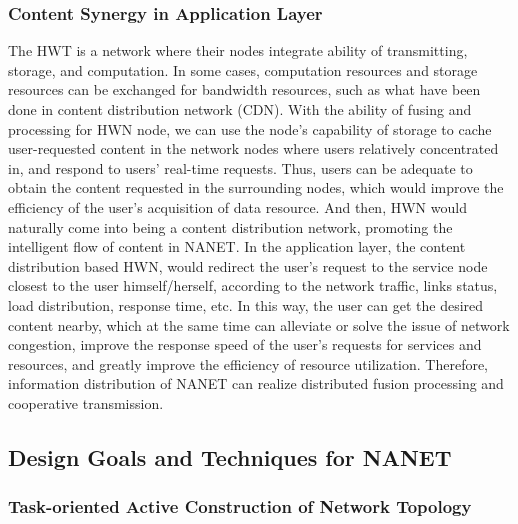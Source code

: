 \documentclass[journal,comsoc]{IEEEtran}
\begin{document}
			\subsubsection{Content Synergy in Application Layer}
				The HWT is a network where their nodes integrate ability of transmitting, storage, and computation.
				In some cases, computation resources and storage resources can be exchanged for bandwidth resources, such as what have been done in content distribution network (CDN). 
				With the ability of fusing and processing for HWN node, we can use the node's capability of storage to cache user-requested content in the network nodes where users relatively concentrated in, and respond to users' real-time requests. Thus, users can be adequate to obtain the content requested in the surrounding nodes, which would improve the efficiency of the user's acquisition of data resource.
				And then, HWN would naturally come into being a content distribution network, promoting the intelligent flow of content in NANET.
				In the application layer, the content distribution based HWN, would redirect the user's request to the service node closest to the user himself/herself, according to the network traffic, links status, load distribution, response time, etc.
				In this way, the user can get the desired content nearby, which at the same time can alleviate or solve the issue of network congestion, improve the response speed of the user's requests for services and resources, and greatly improve the efficiency of resource utilization.
				Therefore, information distribution of NANET can realize distributed fusion processing and cooperative transmission.
		
		\subsection{Design Goals and Techniques for NANET}
		\label{section: framework}	
			
			\subsubsection{Task-oriented Active Construction of Network Topology}
			
\end{document}
